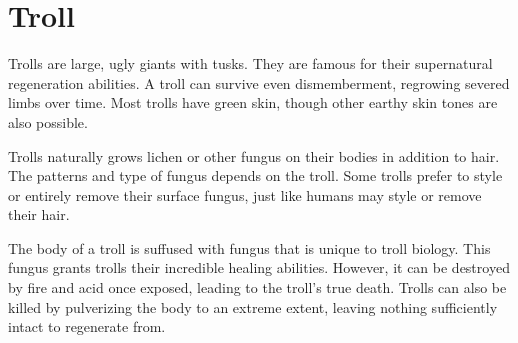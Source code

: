 

\section{Troll}\label{Troll}
  Trolls are large, ugly giants with tusks.
  They are famous for their supernatural regeneration abilities.
  A troll can survive even dismemberment, regrowing severed limbs over time.
  Most trolls have green skin, though other earthy skin tones are also possible.

  Trolls naturally grows lichen or other fungus on their bodies in addition to hair.
  The patterns and type of fungus depends on the troll.
  Some trolls prefer to style or entirely remove their surface fungus, just like humans may style or remove their hair.

  The body of a troll is suffused with fungus that is unique to troll biology.
  This fungus grants trolls their incredible healing abilities.
  However, it can be destroyed by fire and acid once exposed, leading to the troll's true death.
  Trolls can also be killed by pulverizing the body to an extreme extent, leaving nothing sufficiently intact to regenerate from.


